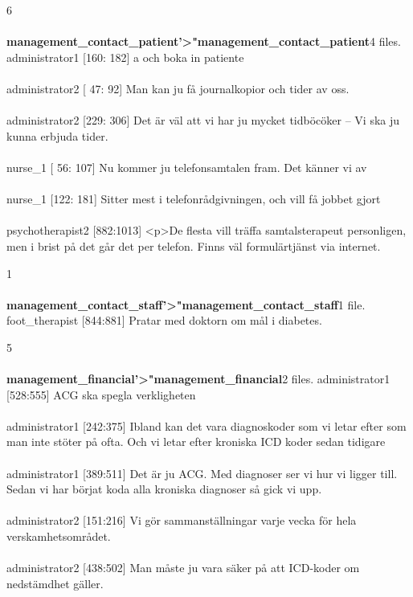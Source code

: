 \documentclass[12pt,a4paper,oneside]{article}
\begin{document}
6 \\\ \\{\bf management\_contact\_patient'>"management\_contact\_patient}4 files.
 administrator1 [160: 182] 
a och boka in patiente %
\\\ \\
 administrator2 [ 47:  92] 
Man kan ju f{\aa} journalkopior och tider av oss. %
\\\ \\
 administrator2 [229: 306] 
Det {\"a}r v{\"a}l att vi har ju mycket tidb{\"o}c{\"o}ker -- Vi ska ju kunna erbjuda tider.  %
\\\ \\
 nurse\_1 [ 56: 107] 
Nu kommer ju telefonsamtalen fram. Det k{\"a}nner vi av %
\\\ \\
 nurse\_1 [122: 181] 
Sitter mest i telefonr{\aa}dgivningen, och vill f{\aa} jobbet gjort %
\\\ \\
 psychotherapist2 [882:1013] 
<p>De flesta vill tr{\"a}ffa samtalsterapeut personligen, men i brist p{\aa} det g{\aa}r det per telefon. Finns v{\"a}l formul{\"a}rtj{\"a}nst via internet.  %

1 \\\ \\{\bf management\_contact\_staff'>"management\_contact\_staff}1 file.
 foot\_therapist [844:881] 
Pratar med doktorn om m{\aa}l i diabetes. %

5 \\\ \\{\bf management\_financial'>"management\_financial}2 files.
 administrator1 [528:555] 
ACG ska spegla verkligheten %
\\\ \\
 administrator1 [242:375] 
Ibland kan det vara diagnoskoder som vi letar efter som man inte st{\"o}ter p{\aa} ofta. Och vi letar efter kroniska ICD koder sedan tidigare %
\\\ \\
 administrator1 [389:511] 
Det {\"a}r ju ACG. Med diagnoser ser vi hur vi ligger till. Sedan vi har b{\"o}rjat  koda alla kroniska diagnoser s{\aa} gick vi upp.  %
\\\ \\
 administrator2 [151:216] 
Vi g{\"o}r sammanst{\"a}llningar varje vecka f{\"o}r hela verskamhetsomr{\aa}det. %
\\\ \\
 administrator2 [438:502] 
Man m{\aa}ste ju vara s{\"a}ker p{\aa} att ICD-koder om nedst{\"a}mdhet g{\"a}ller.  %
\end{document}
